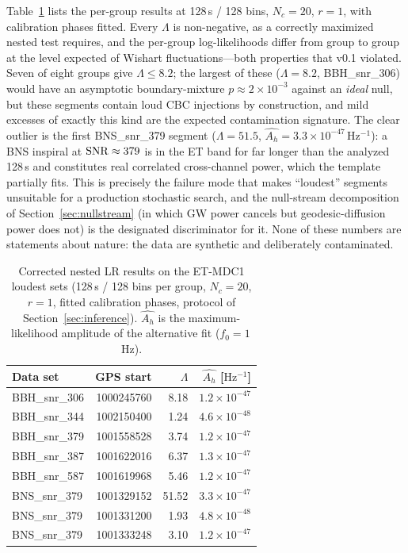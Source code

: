 \documentclass[11pt]{article}
\newcommand{\Ah}{A_h}
\begin{document}
Table~\ref{tab:groups} lists the per-group results at 128\,s / 128 bins, $N_c = 20$, $r = 1$, with calibration phases fitted. Every $\Lambda$ is non-negative, as a correctly maximized nested test requires, and the per-group log-likelihoods differ from group to group at the level expected of Wishart fluctuations---both properties that v0.1 violated. Seven of eight groups give $\Lambda \le 8.2$; the largest of these ($\Lambda = 8.2$, BBH\_snr\_306) would have an asymptotic boundary-mixture $p \approx 2\times10^{-3}$ against an \emph{ideal} null, but these segments contain loud CBC injections by construction, and mild excesses of exactly this kind are the expected contamination signature. The clear outlier is the first BNS\_snr\_379 segment ($\Lambda = 51.5$, $\hat{\Ah} = 3.3\times10^{-47}\,\mathrm{Hz^{-1}}$): a BNS inspiral at ${\rm SNR} \approx 379$ is in the ET band for far longer than the analyzed 128\,s and constitutes real correlated cross-channel power, which the template partially fits. This is precisely the failure mode that makes ``loudest'' segments unsuitable for a production stochastic search, and the null-stream decomposition of Section~\ref{sec:nullstream} (in which GW power cancels but geodesic-diffusion power does not) is the designated discriminator for it. None of these numbers are statements about nature: the data are synthetic and deliberately contaminated.

\begin{table}[t]
\centering
\caption{Corrected nested LR results on the ET-MDC1 loudest sets (128\,s / 128 bins per group, $N_c = 20$, $r = 1$, fitted calibration phases, protocol of Section~\ref{sec:inference}). $\hat{\Ah}$ is the maximum-likelihood amplitude of the alternative fit ($f_0 = 1$\,Hz).}
\label{tab:groups}
\begin{tabular}{lrrr}
\toprule
Data set & GPS start & $\Lambda$ & $\hat{\Ah}$ [$\mathrm{Hz^{-1}}$] \\
\midrule
BBH\_snr\_306 & 1000245760 & 8.18 & $1.2\times10^{-47}$ \\
BBH\_snr\_344 & 1002150400 & 1.24 & $4.6\times10^{-48}$ \\
BBH\_snr\_379 & 1001558528 & 3.74 & $1.2\times10^{-47}$ \\
BBH\_snr\_387 & 1001622016 & 6.37 & $1.3\times10^{-47}$ \\
BBH\_snr\_587 & 1001619968 & 5.46 & $1.2\times10^{-47}$ \\
BNS\_snr\_379 & 1001329152 & 51.52 & $3.3\times10^{-47}$ \\
BNS\_snr\_379 & 1001331200 & 1.93 & $4.8\times10^{-48}$ \\
BNS\_snr\_379 & 1001333248 & 3.10 & $1.2\times10^{-47}$ \\
\bottomrule
\end{tabular}
\end{table}
\end{document}
